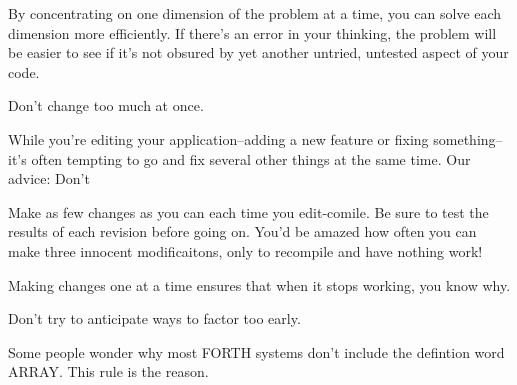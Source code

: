 By concentrating on one dimension of the problem at a time, you can solve each dimension more efficiently. If there's an error in your thinking, the problem will be easier to see if it's not obsured by yet another untried, untested aspect of your code.

\begin{tip}
Don't change too much at once.
\end{tip}
While you're editing your application--adding a new feature or fixing something--it's often tempting to go and fix several other things at the same time. Our advice: Don't

Make as few changes as you can each time you edit-comile. Be sure to test the results of each revision before going on. You'd be amazed how often you can make three innocent modificaitons, only to recompile and have nothing work!

Making changes one at a time ensures that when it stops working, you know why.

\begin{tip}
Don't try to anticipate ways to factor too early.
\end{tip}
Some people wonder why most FORTH systems don't include the defintion word ARRAY. This rule is the reason.


